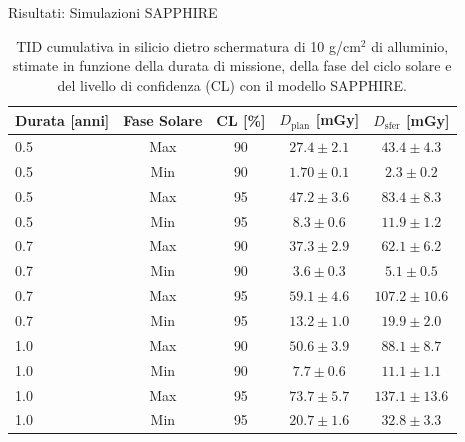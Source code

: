 \documentclass[aspectratio=169]{beamer}
\begin{document}
\begin{frame}{Risultati: Simulazioni SAPPHIRE}
    \centering
    \begin{table}[htbp] 
\centering

\begin{tabular}{lcccc}
\hline\hline
Durata [anni] & Fase Solare & CL [\%] & $D_\mathrm{plan}$ [mGy] & $D_\mathrm{sfer}$ [mGy] \\
\hline
0.5 & Max & 90 & $27.4 \pm 2.1$ & $43.4 \pm 4.3$ \\
0.5 & Min & 90 & $1.70 \pm 0.1$  & $2.3 \pm 0.2$ \\
0.5 & Max & 95 & $47.2 \pm 3.6$ & $83.4 \pm 8.3$ \\
0.5 & Min & 95 & $8.3 \pm 0.6$  & $11.9 \pm 1.2$ \\
0.7 & Max & 90 & $37.3 \pm 2.9$ & $62.1 \pm 6.2$ \\
0.7 & Min & 90 & $3.6 \pm 0.3$  & $5.1 \pm 0.5$ \\
0.7 & Max & 95 & $59.1 \pm 4.6$ & $107.2 \pm 10.6$ \\
0.7 & Min & 95 & $13.2 \pm 1.0$ & $19.9 \pm 2.0$ \\
1.0 & Max & 90 & $50.6 \pm 3.9$ & $88.1 \pm 8.7$ \\
1.0 & Min & 90 & $7.7 \pm 0.6$  & $11.1 \pm 1.1$ \\
1.0 & Max & 95 & $73.7 \pm 5.7$ & $137.1 \pm 13.6$ \\
1.0 & Min & 95 & $20.7 \pm 1.6$ & $32.8 \pm 3.3$ \\
\hline\hline
\end{tabular}
\caption{TID cumulativa in silicio dietro schermatura di 10 g/cm$^2$ di alluminio, stimate in funzione della durata di missione, della fase del ciclo solare e del livello di confidenza (CL) con il modello SAPPHIRE.}
\label{tab:sapphire_doses}

\end{table}
		   
\end{frame}
\end{document}
